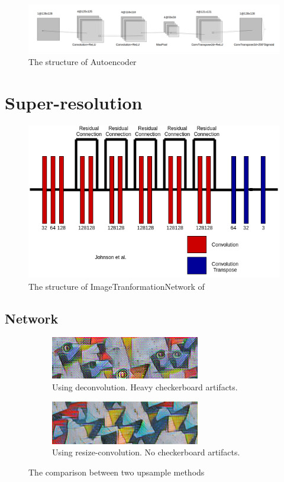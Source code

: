 \documentclass[a4paper,12pt,twoside]{report}
\begin{document}
\begin{figure}
  \centering
  \includegraphics[width=\textwidth]{autoencoder.png}
  \caption{The structure of Autoencoder}
\end{figure}

\section{Super-resolution}
\begin{figure}
	\centering
	\includegraphics[scale=0.5]{ITN.png}
	\caption{The structure of ImageTranformationNetwork of \cite{johnson2016perceptual}}
\end{figure}
\subsection{Network}
\begin{figure}
	\centering
	\begin{subfigure}{0.49\textwidth}
		\centering
		\includegraphics[scale=0.6]{style_artifacts.png}
		\caption{Using deconvolution. Heavy checkerboard artifacts.}
	\end{subfigure}
	\begin{subfigure}{0.49\textwidth}
		\centering
		\includegraphics[scale=0.6]{style_clean.png}
		\caption{Using resize-convolution. No checkerboard artifacts.}
	\end{subfigure}
	\caption{The comparison between two upsample methods\cite{odena2016deconvolution}}
	\label{checkerboard}
\end{figure}
\end{document}
